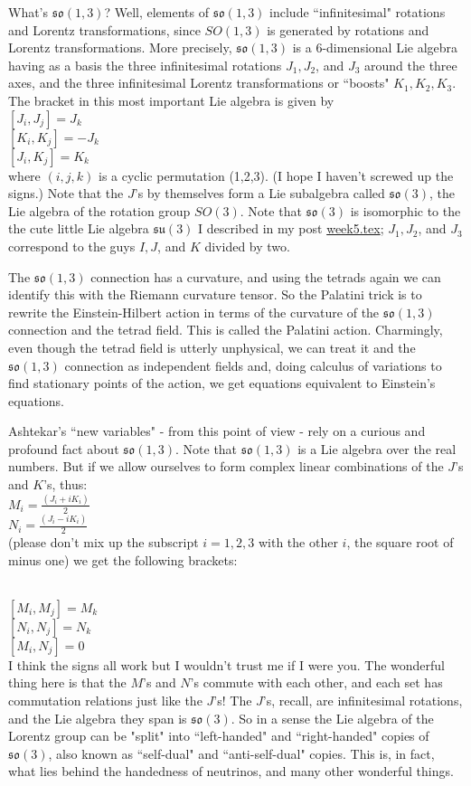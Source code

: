 What's $\mathfrak{so}(1,3)$? Well, elements of $\mathfrak{so(1,3)}$ include ``infinitesimal" rotations and Lorentz transformations, since $SO(1,3)$ is generated by rotations and Lorentz transformations. More precisely, $\mathfrak{so(1,3)}$ is a 6-dimensional Lie algebra having as a basis the three infinitesimal rotations $J_1, J_2$, and $J_3$ around the three axes, and the three infinitesimal Lorentz transformations or ``boosts" $K_1, K_2, K_3$. The bracket in this most important Lie algebra is given by\\
$[J_i,J_j] = J_k$\\
$[K_i,K_j] = -J_k$\\
$[J_i,K_j] = K_k$\\
where $(i,j,k)$ is a cyclic permutation (1,2,3). (I hope I haven't screwed up the signs.) Note that the $J$'s by themselves form a Lie subalgebra called $\mathfrak{so}(3)$, the Lie algebra of the rotation group $SO(3)$. Note that $\mathfrak{so}(3)$ is isomorphic to the the cute little Lie algebra $\mathfrak{su}(3)$ I described in my post {\hyperref[week5]{week5.tex}}; $J_1, J_2$, and $J_3$ correspond to the guys $I, J$, and $K$ divided by two.

The $\mathfrak{so(1,3)}$ connection has a curvature, and using the tetrads again we can identify this with the Riemann curvature tensor. So the Palatini trick is to rewrite the Einstein-Hilbert action in terms of the curvature of the $\mathfrak{so(1,3)}$ connection and the tetrad field. This is called the Palatini action. Charmingly, even though the tetrad field is utterly unphysical, we can treat it and the $\mathfrak{so(1,3)}$ connection as independent fields and, doing calculus of variations to find stationary points of the action, we get equations equivalent to Einstein's equations.

Ashtekar's ``new variables" - from this point of view - rely on a curious and profound fact about $\mathfrak{so(1,3)}$. Note that $\mathfrak{so(1,3)}$ is a Lie algebra over the real numbers. But if we allow ourselves to form complex linear combinations of the $J$'s and $K$'s, thus:
\\
$M_i = \frac{(J_i + iK_i)}{2}$\\
$N_i = \frac{(J_i - iK_i)}{2}$\\
(please don't mix up the subscript $i = 1,2,3$ with the other $i$, the square root of minus one) we get the following brackets:

\\
$[M_i,M_j] = M_k$\\
$[N_i,N_j] = N_k$\\
$[M_i,N_j] = 0$\\
I think the signs all work but I wouldn't trust me if I were you. The wonderful thing here is that the $M$'s and $N$'s commute with each other, and each set has commutation relations just like the $J$'s! The $J$'s, recall, are infinitesimal rotations, and the Lie algebra they span is $\mathfrak{so}(3)$. So in a sense the Lie algebra of the Lorentz group can be "split" into ``left-handed" and ``right-handed" copies of $\mathfrak{so}(3)$, also known as ``self-dual" and ``anti-self-dual" copies. This is, in fact, what lies behind the handedness of neutrinos, and many other wonderful things.

